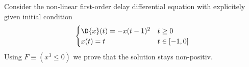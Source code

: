             Consider the non-linear first-order delay differential equation with explicitely given initial condition
            \begin{equation}
                \begin{cases}
                    \D{x}(t) = -x(t-1)^2 & t \geq 0\\
                    x(t) = t & t \in [-1,0]
                \end{cases}
            \end{equation}
            Using $F\equiv(x^3\leq 0)$ we prove that the solution stays non-positiv.
            \begin{small}
                \begin{sequentdeduction}
                \end{sequentdeduction}
            \end{small}

